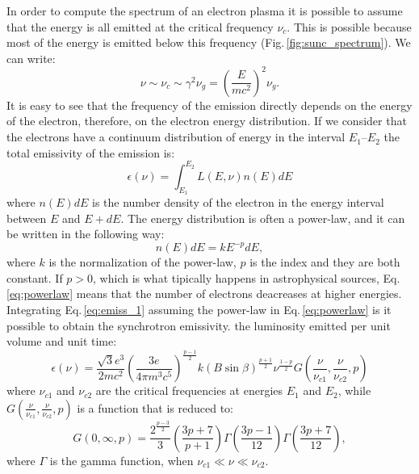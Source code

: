 \documentclass[../thesis.tex]{subfiles}
\begin{document}
In order to compute the spectrum of an electron plasma it is possible to assume that the energy is all emitted at the critical frequency $\nu_c$. 
This is possible because most of the energy is emitted below this frequency (Fig.\,\ref{fig:sunc_spectrum}).
We can write:
\begin{equation}
    \label{eq: new_crit_freq}
    \nu \sim \nu_c\sim \gamma^2 \nu_g = \left(\frac{E}{mc^2}\right)^2\nu_g.
\end{equation}
It is easy to see that the frequency of the emission directly depends on the energy of the electron, therefore, on the electron energy distribution.
If we consider that the electrons have a continuum distribution of energy in the interval $E_1$--$E_2$ the total emissivity of the emission is:
\begin{equation}
    \label{eq:emiss_1}
    \epsilon(\nu) = \int_{E_1}^{E_2} L(E,\nu) n(E)dE
\end{equation}
where $n(E)dE$ is the number density of the electron in the energy interval between $E$ and $E+dE$.
The energy distribution is often a power-law, and it can be written in the following way:
\begin{equation}
    \label{eq:powerlaw}
    n(E)dE=kE^{-p}dE,
\end{equation}
where $k$ is the normalization of the power-law, $p$ is the index and they are both constant.
If $p>0$, which is what tipically happens in astrophysical sources, Eq.\,\ref{eq:powerlaw} means that the number of electrons deacreases at higher energies.
Integrating Eq.\,\ref{eq:emiss_1} assuming the power-law in Eq.\,\ref{eq:powerlaw} is it possible to obtain the synchrotron emissivity. the luminosity emitted per unit volume and unit time:
\begin{equation}
    \label{eq:emiss_2}
    \epsilon(\nu)=\frac{\sqrt{3}e^3}{2mc^2}\left(\frac{3e}{4\pi m^3 c^5}\right)^{\frac{p-1}{2}}k\left(B\sin\beta\right)^{\frac{p+1}{2}}\nu^{\frac{1-p}{2}}G\left(\frac{\nu}{\nu_{c1}},\frac{\nu}{\nu_{c2}},p\right)
\end{equation}
where $\nu_{c1}$ and $\nu_{c2}$ are the critical frequencies at energies $E_1$ and $E_2$, while $G\left(\frac{\nu}{\nu_{c1}},\frac{\nu}{\nu_{c2}},p\right)$ is a function that is reduced to:
\begin{equation}
    \label{eq:G}
    G\left(0,\infty,p\right) = \frac{2^{\frac{p-3}{2}}}{3}\left(\frac{3p+7}{p+1}\right)\Gamma\left(\frac{3p-1}{12}\right)\Gamma\left(\frac{3p+7}{12}\right),
\end{equation}
where $\Gamma$ is the gamma function, when $\nu_{c1}\ll\nu\ll\nu_{c2}$.
\end{document}
